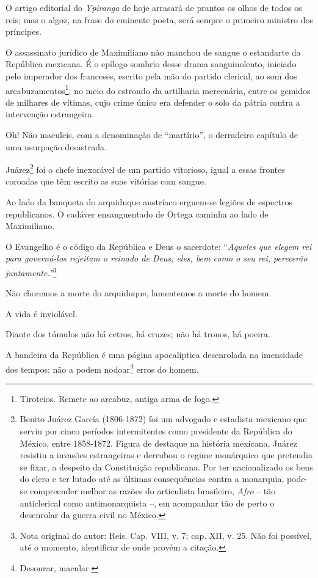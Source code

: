O artigo editorial do \emph{Ypiranga} de hoje arrasará de prantos os
olhos de todos os reis; mas o algoz, na frase do eminente poeta, será
sempre o primeiro ministro dos príncipes.

O assassinato jurídico de Maximiliano não manchou de sangue o estandarte
da República mexicana. É o epílogo sombrio desse drama sanguinolento,
iniciado pelo imperador dos franceses, escrito pela mão do partido
clerical, ao som dos arcabuzamentos\footnote{Tiroteios. Remete ao
  arcabuz, antiga arma de fogo.}, no meio do estrondo da artilharia
mercenária, entre os gemidos de milhares de vítimas, cujo crime único
era defender o solo da pátria contra a intervenção estrangeira.

Oh! Não maculeis, com a denominação de ``martírio'', o derradeiro capítulo
de uma usurpação desastrada.

Juárez\footnote{Benito Juárez García (1806-1872) foi um advogado e
  estadista mexicano que serviu por cinco períodos intermitentes como
  presidente da República do México, entre 1858-1872. Figura de destaque
  na história mexicana, Juárez resistiu a invasões estrangeiras e
  derrubou o regime monárquico que pretendia se fixar, a despeito da
  Constituição republicana. Por ter nacionalizado os bens do clero e ter
  lutado até as últimas consequências contra a monarquia, pode-se
  compreender melhor as razões do articulista brasileiro, \emph{Afro} --
  tão anticlerical como antimonarquista --, em acompanhar tão de perto o
  desenrolar da guerra civil no México.} foi o chefe inexorável de um
partido vitorioso, igual a essas frontes coroadas que têm escrito as
suas vitórias com sangue.

Ao lado da banqueta do arquiduque austríaco erguem-se legiões de
espectros republicanos. O cadáver ensanguentado de Ortega caminha ao
lado de Maximiliano.

O Evangelho é o código da República e Deus o sacerdote: ``\emph{Aqueles
que elegem rei para governá-los rejeitam o reinado de Deus; eles, bem
como o seu rei, perecerão juntamente.''}\footnote{Nota original do
  autor: Reis. Cap. VIII, v. 7; cap. XII, v. 25. Não foi possível, até o
  momento, identificar de onde provém a citação.}

Não choremos a morte do arquiduque, lamentemos a morte do homem.

A vida é inviolável.

Diante dos túmulos não há cetros, há cruzes; não há tronos, há poeira.

A bandeira da República é uma página apocalíptica desenrolada na
imensidade dos tempos; não a podem nodoar\footnote{Desonrar, macular.}
erros do homem.

